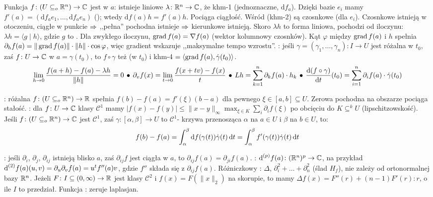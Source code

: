 Funkcja  $f \colon (U \subseteq_o \mathbb{R}^n) \to \mathbb{C}$ jest  w $a$: istnieje liniowe $\lambda \colon \mathbb{R}^n \to \mathbb{C}$, że khm-1 (jednoznaczne,  $\textrm{d}f_a$).
Dzięki bazie $e_i$ mamy $f'(a) = (\textrm{d}f_ae_1, \dots, \textrm{d}f_ae_n)$ (); wtedy $\textrm{d}f(a)h= f'(a)h$.
Pociąga ciągłość.
Wśród  (khm-2) są czosnkowe (dla $e_i$).
Czosnkowe istnieją w otoczeniu, ciągłe w punkcie $\Rightarrow$ ,,pełna'' pochodna istnieje $\Rightarrow$ kierunkowe istnieją.
Skoro $\lambda h$ to forma liniowa, pochodzi od iloczynu: $\lambda h = \langle g \mid h \rangle$, gdzie $g$ to .
Dla zwykłego iloczynu, $\operatorname{grad} f(a) = \nabla f(a)$ (wektor kolumnowy czosnków).
Kąt $\varphi$ między $\operatorname{grad} f(a)$ i $h$ spełnia $\partial_h f(a) = \|\operatorname{grad} f(a)\| \cdot \| h \| \cdot \cos \varphi$, więc gradient wskazuje ,,maksymalne tempo wzrostu''.
: jeśli $\gamma = (\gamma_1, \dots, \gamma_n) \colon I \to U$ jest różalna w $t_0$, zaś $f \colon U \to \mathbb{C}$ w $a = \gamma(t_0)$, to $f \circ \gamma$ też (w $t_0$) i khm-4 $=\langle \operatorname{grad} f(a), \dot{\gamma}(t_0) \rangle$.
\[
	\lim_{h \to 0} \frac{f(a+h) - f(a) - \lambda h}{\| h \|} = 0 \, \bullet \,
	\partial_vf(x) = \lim_{t \to 0} \frac{f(x+tv) - f(x)}{t} \, \bullet \,
	Lh = \sum_{k=1}^n \partial_k f(a) \cdot h_k \, \bullet \,
	\frac{\textrm{d}(f \circ \gamma)}{\textrm{d} t} (t_0) = \sum_{i=1}^n \partial_i f(a) \cdot \dot{\gamma}(t_0)
\]

:  różalna $f \colon (U \subseteq_o \mathbb{R}^n) \to \mathbb{R}$ spełnia $f(b) - f(a) = f'(\xi) (b-a)$ dla pewnego $\xi \in [a,b] \subseteq U$. 
Zerowa pochodna na obszarze pociąga stałość.
: dla $f \colon U \to \mathbb{C}$ klasy $\mathscr C^1$ mamy $|f(x) - f(y)| \le \|x-y\|_\infty \max_{\xi \in K} \sum_i \partial_i f(\xi)$ po obcięciu do $K \subseteq^k U$ (lipschitzowskość).
Jeśli $f \colon (U \subseteq_o \mathbb{R}^n) \to \mathbb{C}$ jest $\mathscr C^1$, zaś $\gamma \colon [\alpha, \beta] \to U$ to $\mathscr C^1$- krzywa przenosząca $\alpha$ na $a \in U$ i $\beta$ na $b \in U$, to:
\[
	f(b) - f(a) = \int_\alpha^\beta \textrm{d}{f(\gamma(t))} \dot{\gamma}(t) \,\textrm{d}{t} = \int_\alpha^\beta f'(\gamma(t)) \dot{\gamma}(t) \,\textrm{d}{t}
\]

:  jeśli $\partial_i$, $\partial_j$, $\partial_{ij}$ istnieją blisko $a$, zaś $\partial_{ij} f$ jest ciągła w $a$, to $\partial_{ij} f(a) = \partial_{ji}f(a)$.
: $\textrm{d}^{(p)} f(a) \colon (\mathbb{R}^n)^p \to \mathbb{C}$, na przykład $\textrm{d}^{(2)} f(a)(u,v) = \partial_u \partial_v f (a) = u^t f''(a) v$, gdzie  $f''$ składa się z $\partial_{ij} f(a)$.
Różniczkowy : $\Delta$, $\partial_i^2 + \ldots + \partial_n^2$ (ślad $H_f$), nie zależy od ortonormalnej bazy $\mathbb{R}^n$.
Jeżeli $F \colon I \subseteq (0, \infty) \to \mathbb{R}$ jest klasy $\mathscr C^2$ i $f(x) = F(\|x\|_2)$ na skorupie, to mamy $\Delta f(x) = F''(r) + (n-1) F'(r) : r$, o ile $I$ to przedział.
Funkcja : zeruje laplasjan.

